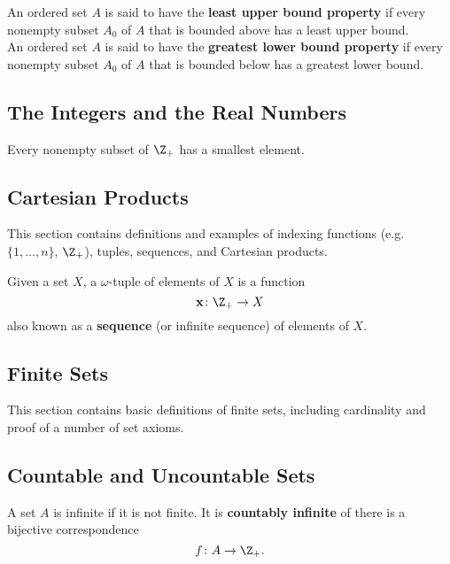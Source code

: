 \begin{definition}
An ordered set $A$ is said to have the \textbf{least upper bound property} if every nonempty subset $A_0$ of $A$ that is bounded above has a least upper bound. \\

An ordered set $A$ is said to have the \textbf{greatest lower bound property} if every nonempty subset $A_0$ of $A$ that is bounded below has a greatest lower bound.
\end{definition}

\subsection{The Integers and the Real Numbers}
\begin{theorem}
Every nonempty subset of $\Z_+$ has a smallest element.
\end{theorem}

\subsection{Cartesian Products}
This section contains definitions and examples of indexing functions (e.g. $\{ 1, \dots, n \}$, $\Z_+$), tuples, sequences, and Cartesian products.

\begin{definition}
Given a set $X$, a $\omega$-tuple of elements of $X$ is a function 
\[
    \mathbf{x} \colon \Z_+ \rightarrow X
\]
also known as a \textbf{sequence} (or infinite sequence) of elements of $X$.
\end{definition}

\subsection{Finite Sets}
This section contains basic definitions of finite sets, including cardinality and proof of a number of set axioms.

\subsection{Countable and Uncountable Sets}
\begin{definition}
A set $A$ is infinite if it is not finite. It is \textbf{countably infinite} of there is a bijective correspondence
\[
    f \colon A \rightarrow \Z_+.
\] 
\end{definition}

